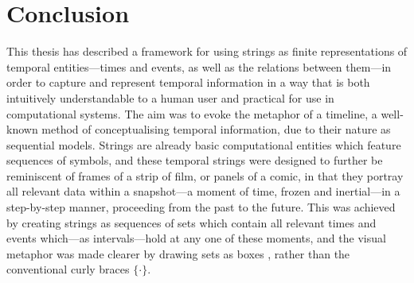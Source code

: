 \documentclass[a4paper,12pt,leqno]{article}
\newcommand{\vph}[1]{\vphantom{#1}}
\newcommand{\ebox}[1]{\fbox{$\vph{'(),}#1$}}
\begin{document}
\section{Conclusion}\label{sec:conclusion}
% 
% 
% 
% 
% 
This thesis has described a framework for using strings as finite representations of temporal entities---times and events, as well as the relations between them---in order to capture and represent temporal information in a way that is both intuitively understandable to a human user and practical for use in computational systems. The aim was to evoke the metaphor of a timeline, a well-known method of conceptualising temporal information, due to their nature as sequential models. Strings are already basic computational entities which feature sequences of symbols, and these temporal strings were designed to further be reminiscent of frames of a strip of film, or panels of a comic, in that they portray all relevant data within a snapshot---a moment of time, frozen and inertial---in a step-by-step manner, proceeding from the past to the future. This was achieved by creating strings as sequences of sets which contain all relevant times and events which---as intervals---hold at any one of these moments, and the visual metaphor was made clearer by drawing sets as boxes \ebox{\cdot}, rather than the conventional curly braces $\{\cdot\}$.
\end{document}
